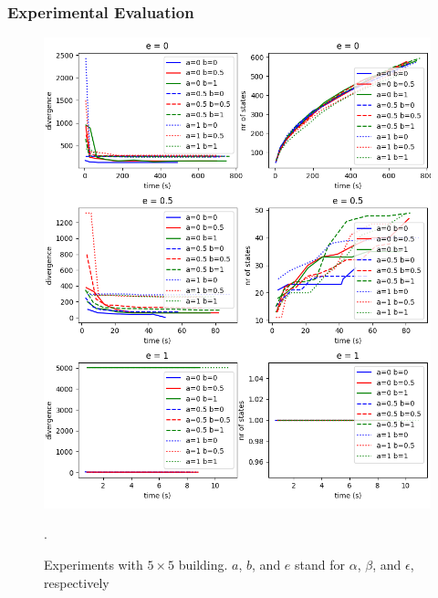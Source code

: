 \documentclass{beamer}
\begin{document}
\begin{frame}
\frametitle{Experimental Evaluation}

\begin{figure}
\centering
\includegraphics[width=\columnwidth]{big_exp.png}
\caption{Experiments with $5\times5$ building. $a$, $b$, and $e$ stand for $\alpha$, $\beta$, and $\epsilon$, respectively \label{fig:big_experiments}}.
\end{figure}

\end{frame}
\end{document}
